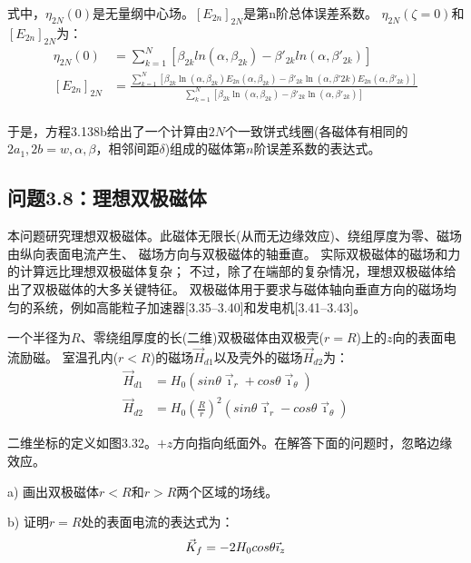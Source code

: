式中，$\eta_{2N}(0)$是无量纲中心场。$[E_{2n}]_{2N}$是第n阶总体误差系数。
$\eta_{2N}(\zeta=0)$和$[E_{2n}]_{2N}$为：
\begin{subequations}
	\begin{align}
\eta_{2N}(0)&=\sum_{k=1}^{N}[\beta_{2k}ln(\alpha,\beta_{2k})-\beta'_{2k}ln(\alpha,\beta'_{2k})]\\%
{[E_{2n}]}_{2N}&=\frac{\sum_{k=1}^{N}[\beta_{2k}\ln(\alpha,\beta_{2k})E_{2n}(\alpha,\beta_{2k})-\beta'_{2k}\ln(\alpha,\beta'{2k})E_{2n}(\alpha,\beta'_{2k})]}{\sum_{k=1}^{N}[\beta_{2k}\ln(\alpha,\beta_{2k})-\beta'_{2k}\ln(\alpha,\beta'_{2k})]}\\%
	\end{align}
\end{subequations}

于是，方程3.138b给出了一个计算由$2N$个一致饼式线圈(各磁体有相同的$2a_1,2b=w,\alpha,\beta$，相邻间距$\delta$)组成的磁体第$n$阶误差系数的表达式。


\subsection{问题3.8：理想双极磁体}
本问题研究理想双极磁体。此磁体无限长(从而无边缘效应)、绕组厚度为零、磁场由纵向表面电流产生、
磁场方向与双极磁体的轴垂直。
实际双极磁体的磁场和力的计算远比理想双极磁体复杂；
不过，除了在端部的复杂情况，理想双极磁体给出了双极磁体的大多关键特征。
双极磁体用于要求与磁体轴向垂直方向的磁场均匀的系统，例如高能粒子加速器[3.35–3.40]和发电机[3.41–3.43]。

一个半径为$R$、零绕组厚度的长(二维)双极磁体由双极壳($r=R$)上的$z$向的表面电流励磁。
室温孔内($r<R$)的磁场$\vec{H}_{d1}$以及壳外的磁场$\vec{H}_{d2}$为：
\begin{subequations}
	\begin{align}
\vec{H}_{d1}&=H_{0}(sin\theta\vec{\imath}_{r}+cos\theta\vec{\imath}_{\theta})\\%
\vec{H}_{d2}&=H_{0}(\frac{R}{r})^2(sin\theta\vec{\imath}_{r}-cos\theta\vec{\imath}_{\theta})%
	\end{align}
\end{subequations}

二维坐标的定义如图3.32。$+z$方向指向纸面外。在解答下面的问题时，忽略边缘效应。

a) 画出双极磁体$r<R$和$r>R$两个区域的场线。

b) 证明$r=R$处的表面电流的表达式为：
\begin{equation}
\vec{K}_{f}=-2H_{0}cos\theta\vec{\imath}_{z}\\%
\end{equation}

